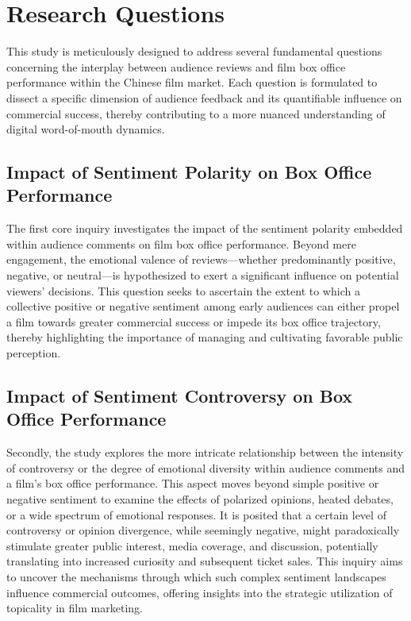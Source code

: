 \documentclass{article}
\begin{document}
\section{Research Questions}
This study is meticulously designed to address several fundamental questions concerning the interplay between audience reviews and film box office performance within the Chinese film market. Each question is formulated to dissect a specific dimension of audience feedback and its quantifiable influence on commercial success, thereby contributing to a more nuanced understanding of digital word-of-mouth dynamics.

\subsection{Impact of Sentiment Polarity on Box Office Performance}
The first core inquiry investigates the impact of the sentiment polarity embedded within audience comments on film box office performance. Beyond mere engagement, the emotional valence of reviews—whether predominantly positive, negative, or neutral—is hypothesized to exert a significant influence on potential viewers' decisions. This question seeks to ascertain the extent to which a collective positive or negative sentiment among early audiences can either propel a film towards greater commercial success or impede its box office trajectory, thereby highlighting the importance of managing and cultivating favorable public perception.

\subsection{Impact of Sentiment Controversy on Box Office Performance}
Secondly, the study explores the more intricate relationship between the intensity of controversy or the degree of emotional diversity within audience comments and a film's box office performance. This aspect moves beyond simple positive or negative sentiment to examine the effects of polarized opinions, heated debates, or a wide spectrum of emotional responses. It is posited that a certain level of controversy or opinion divergence, while seemingly negative, might paradoxically stimulate greater public interest, media coverage, and discussion, potentially translating into increased curiosity and subsequent ticket sales. This inquiry aims to uncover the mechanisms through which such complex sentiment landscapes influence commercial outcomes, offering insights into the strategic utilization of topicality in film marketing.
\end{document}
